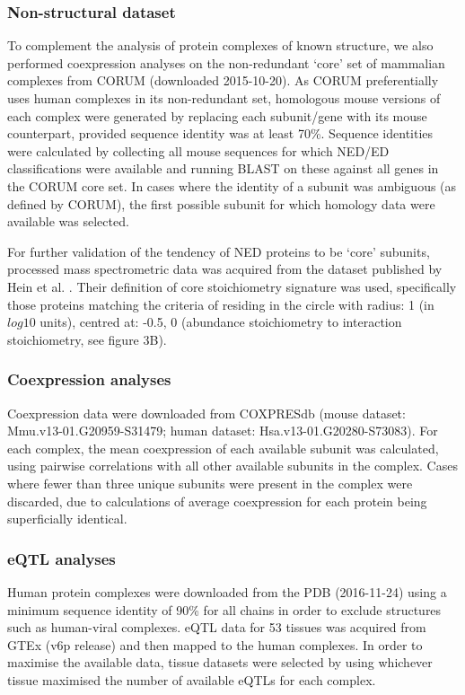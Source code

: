 \documentclass[a4paper,11pt,twoside,openright]{scrbook}
\begin{document}
\subsubsection{Non-structural dataset}
To complement the analysis of protein complexes of known structure, we also
performed coexpression analyses on the non-redundant `core' set of mammalian
complexes from CORUM \cite{Ruepp2009} (downloaded 2015-10-20). As CORUM
preferentially uses human complexes in its non-redundant set, homologous mouse
versions of each complex were generated by replacing each subunit/gene with its
mouse counterpart, provided sequence identity was at least 70\%. Sequence
identities were calculated by collecting all mouse sequences for which NED/ED
classifications were available and running BLAST on these against all genes in
the CORUM core set. In cases where the identity of a subunit was ambiguous (as
defined by CORUM), the first possible subunit for which homology data were
available was selected.

For further validation of the tendency of NED proteins to be `core' subunits,
processed mass spectrometric data was acquired from the dataset published by
Hein et al. \cite{Hein2015}. Their definition of core stoichiometry signature
was used, specifically those proteins matching the criteria of residing in the
circle with radius: 1 (in $log{10}$ units), centred at: -0.5, 0 (abundance
stoichiometry to interaction stoichiometry, see figure 3B\cite{Hein2015}).

\subsubsection{Coexpression analyses}
Coexpression data were downloaded from COXPRESdb \cite{Okamura2014} (mouse
dataset: Mmu.v13-01.G20959-S31479; human dataset: Hsa.v13-01.G20280-S73083). For
each complex, the mean coexpression of each available subunit was calculated,
using pairwise correlations with all other available subunits in the complex.
Cases where fewer than three unique subunits were present in the complex were
discarded, due to calculations of average coexpression for each protein being
superficially identical.

\subsubsection{eQTL analyses}
Human protein complexes were downloaded from the PDB (2016-11-24) using a
minimum sequence identity of 90\% for all chains in order to exclude structures
such as human-viral complexes. eQTL data for 53 tissues was acquired from GTEx
(v6p release) and then mapped to the human complexes. In order to maximise the
available data, tissue datasets were selected by using whichever tissue
maximised the number of available eQTLs for each complex.
\end{document}
